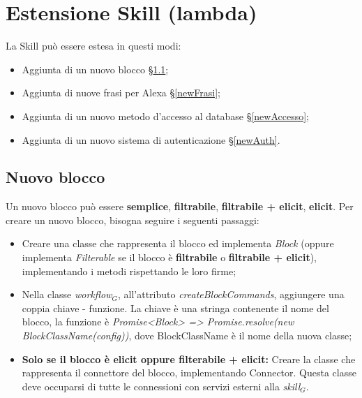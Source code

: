 \section{Estensione Skill (lambda)}
La Skill può essere estesa in questi modi:
\begin{itemize}
    \item Aggiunta di un nuovo blocco \S\ref{newBlock};
    \item Aggiunta di nuove frasi per Alexa \S\ref{newFrasi};
    \item Aggiunta di un nuovo metodo d'accesso al database \S\ref{newAccesso};
    \item Aggiunta di un nuovo sistema di autenticazione \S\ref{newAuth}.
\end{itemize}
\subsection{Nuovo blocco}\label{newBlock}
Un nuovo blocco può essere \textbf{semplice}, \textbf{filtrabile}, \textbf{filtrabile + elicit}, \textbf{elicit}.
Per creare un nuovo blocco, bisogna seguire i seguenti passaggi:
\begin{itemize}
	\item Creare una classe che rappresenta il blocco ed implementa \textit{Block} (oppure implementa \textit{Filterable} se il blocco è \textbf{filtrabile} o \textbf{filtrabile + elicit}), implementando i metodi rispettando le loro firme;
	\item Nella classe \textit{workflow$_{G}$}, all'attributo \textit{createBlockCommands}, aggiungere una coppia chiave - funzione. La chiave è una stringa contenente il nome del blocco, la funzione è \textit{Promise<Block> => Promise.resolve(new BlockClassName(config))}, dove BlockClassName è il nome della nuova classe;
	\item \textbf{Solo se il blocco è elicit oppure filterabile + elicit:} Creare la classe che rappresenta il connettore del blocco, implementando Connector. Questa classe deve occuparsi di tutte le connessioni con servizi esterni alla \textit{skill$_{G}$}.
\end{itemize}

